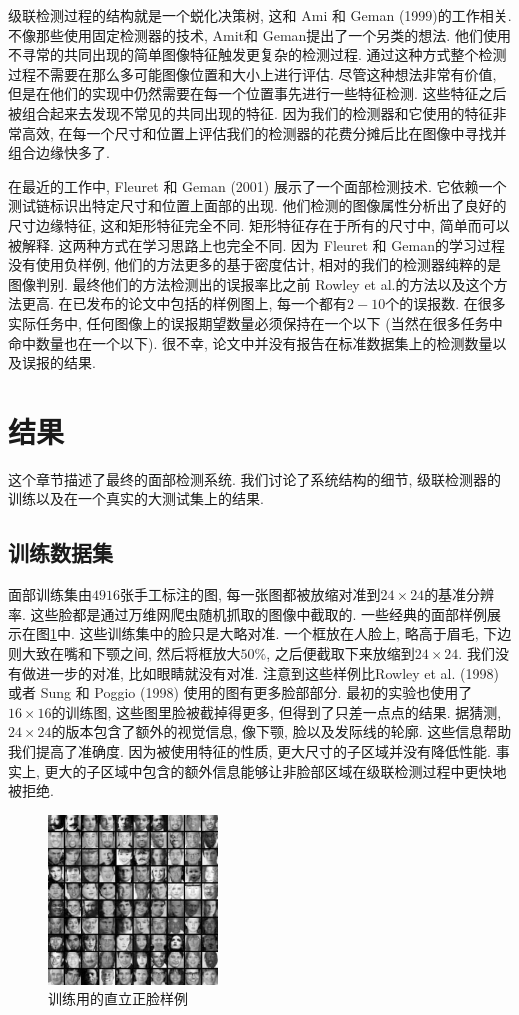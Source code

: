 \documentclass[a4paper,utf8,11pt, onecolumn]{ctexart}
\begin{document}
级联检测过程的结构就是一个蜕化决策树, 这和 Ami 和 Geman (1999)的工作相关. 不像那些使用固定检测器的技术, Amit和 Geman提出了一个另类的想法. 他们使用不寻常的共同出现的简单图像特征触发更复杂的检测过程.
通过这种方式整个检测过程不需要在那么多可能图像位置和大小上进行评估. 尽管这种想法非常有价值, 但是在他们的实现中仍然需要在每一个位置事先进行一些特征检测. 这些特征之后被组合起来去发现不常见的共同出现的特征. 因为我们的检测器和它使用的特征非常高效, 在每一个尺寸和位置上评估我们的检测器的花费分摊后比在图像中寻找并组合边缘快多了.

在最近的工作中, Fleuret 和 Geman (2001) 展示了一个面部检测技术. 它依赖一个测试链标识出特定尺寸和位置上面部的出现. 他们检测的图像属性分析出了良好的尺寸边缘特征, 这和矩形特征完全不同. 矩形特征存在于所有的尺寸中, 简单而可以被解释. 这两种方式在学习思路上也完全不同.
因为 Fleuret 和 Geman的学习过程没有使用负样例, 他们的方法更多的基于密度估计, 相对的我们的检测器纯粹的是图像判别. 最终他们的方法检测出的误报率比之前 Rowley et al.的方法以及这个方法更高. 在已发布的论文中包括的样例图上, 每一个都有$2-10$个的误报数. 在很多实际任务中, 任何图像上的误报期望数量必须保持在一个以下 (当然在很多任务中命中数量也在一个以下). 很不幸, 论文中并没有报告在标准数据集上的检测数量以及误报的结果.
\section{结果}\label{sec:result}
这个章节描述了最终的面部检测系统. 我们讨论了系统结构的细节, 级联检测器的训练以及在一个真实的大测试集上的结果.
\subsection{训练数据集}
面部训练集由$4916$张手工标注的图, 每一张图都被放缩对准到$24\times24$的基准分辨率. 这些脸都是通过万维网爬虫随机抓取的图像中截取的. 一些经典的面部样例展示在图\ref{fig:face_used}中. 这些训练集中的脸只是大略对准. 一个框放在人脸上, 略高于眉毛, 下边则大致在嘴和下颚之间, 然后将框放大$50\%$, 之后便截取下来放缩到$24\times24$. 我们没有做进一步的对准, 比如眼睛就没有对准. 注意到这些样例比Rowley et al. (1998) 或者 Sung 和 Poggio (1998) 使用的图有更多脸部部分. 最初的实验也使用了$16\times16$的训练图, 这些图里脸被截掉得更多, 但得到了只差一点点的结果. 据猜测, $24\times24$的版本包含了额外的视觉信息, 像下颚, 脸以及发际线的轮廓. 这些信息帮助我们提高了准确度. 因为被使用特征的性质, 更大尺寸的子区域并没有降低性能. 事实上, 更大的子区域中包含的额外信息能够让非脸部区域在级联检测过程中更快地被拒绝.
\begin{figure}
\centering
\includegraphics[width=0.4\textwidth]{face_used.png}
\caption{训练用的直立正脸样例}
\label{fig:face_used}
\end{figure}
\end{document}
